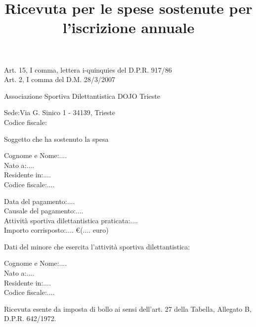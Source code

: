 \documentclass{djtsdoc}
\title{Ricevuta per le spese sostenute per l'iscrizione annuale}
\date{}
\begin{document}
	\maketitle
	
	\fontsize{11pt}{14pt}\selectfont
	
	\begin{center}
		Art. 15, I comma, lettera i-quinquies del D.P.R. 917/86\\
		Art. 2, I comma del D.M. 28/3/2007
	\end{center}
	\vspace{0.4in}
	
	Associazione Sportiva Dilettantistica DOJO Trieste
	\begin{adjustwidth}{0.5in}{0pt}
		Sede:\quad Via G. Sinico 1 - 34139, Trieste \\
		Codice fiscale:
	\end{adjustwidth}
	\vspace{0.2in}
	
	Soggetto che ha sostenuto la spesa
	\begin{adjustwidth}{0.5in}{0pt}
		Cognome e Nome:\quad .... \\
		Nato a:\quad .... \\
		Residente in:\quad .... \\
		Codice fiscale:\quad ....
	\end{adjustwidth}
	\vspace{0.4in}
	
	Data del pagamento:\quad .... \\[10pt]
	Causale del pagamento:\quad .... \\[10pt]
	Attività sportiva dilettantistica praticata:\quad .... \\[10pt]
	Importo corrisposto:\quad .... €\quad (.... euro)
	\vspace{0.4in}
	
	Dati del minore che esercita l'attività sportiva dilettantistica:
	\begin{adjustwidth}{0.5in}{0pt}
		Cognome e Nome:\quad .... \\
		Nato a:\quad .... \\
		Residente in:\quad .... \\
		Codice fiscale:\quad ....
	\end{adjustwidth}
	\vspace{0.5in}
	
	\vspace{1in}
	
	\begin{center}
		Ricevuta esente da imposta di bollo ai sensi dell'art. 27 della Tabella, Allegato B, D.P.R. 642/1972.
	\end{center}
	
\end{document}
